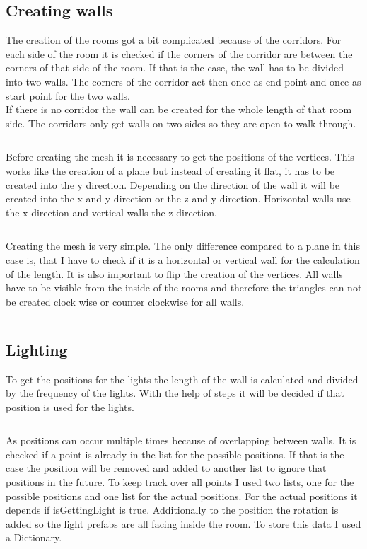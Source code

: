 \documentclass[a4paper,11pt,oneside]{scrreprt}
\begin{document}
\subsection{Creating walls}
The creation of the rooms got a bit complicated because of the corridors. For each side of the room it is checked if the corners of the corridor are between the corners of that side of the room. If that is the case, the wall has to be divided into two walls. The corners of the corridor act then once as end point and once as start point for the two walls. 
\\
If there is no corridor the wall can be created for the whole length of that room side. The corridors only get walls on two sides so they are open to walk through. 
\inputminted[fontsize=\footnotesize,linenos]{csharp}{code/CreateWalls1.cs}

Before creating the mesh it is necessary to get the positions of the vertices. This works like the creation of a plane but instead of creating it flat, it has to be created into the y direction. Depending on the direction of the wall it will be created into the x and y direction or the z and y direction. Horizontal walls use the x direction and vertical walls the z direction. 
\inputminted[fontsize=\footnotesize,linenos]{csharp}{code/CreateWalls2.cs}

\newpage
Creating the mesh is very simple. The only difference compared to a plane in this case is, that I have to check if it is a horizontal or vertical wall for the calculation of the length. It is also important to flip the creation of the vertices. All walls have to be visible from the inside of the rooms and therefore the triangles can not be created clock wise or counter clockwise for all walls.
\inputminted[fontsize=\footnotesize,linenos]{csharp}{code/CreateWalls3.cs}

\subsection{Lighting}
To get the positions for the lights the length of the wall is calculated and divided by the frequency of the lights. With the help of steps it will be decided if that position is used for the lights. 
\inputminted[fontsize=\footnotesize,linenos]{csharp}{code/Lights1.cs}

As positions can occur multiple times because of overlapping between walls, It is checked if a point is already in the list for the possible positions. If that is the case the position will be removed and added to another list to ignore that positions in the future. To keep track over all points I used two lists, one for the possible positions and one list for the actual positions. For the actual positions it depends if isGettingLight is true. Additionally to the position the rotation is added so the light prefabs are all facing inside the room. To store this data I used a Dictionary. 
\inputminted[fontsize=\footnotesize,linenos]{csharp}{code/Lights2.cs}
\end{document}
